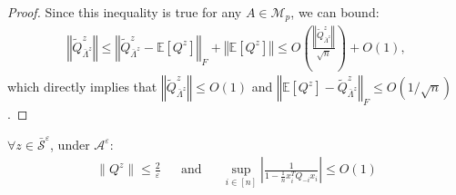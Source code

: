\documentclass{ws-rmta}
\begin{document}
\begin{proof}
  Since this inequality is true for any $A \in \mathcal M_p$, we can bound:
  \begin{align*}
    \left\Vert \tilde Q^z_{\bar \Lambda^z} \right\Vert \leq \left\Vert \tilde Q^z_{\bar \Lambda^z} - \mathbb E[Q^z] \right\Vert_F + \left\Vert \mathbb E[Q^z] \right\Vert \leq O \left( \frac{\left\Vert \tilde Q^z_{\bar \Lambda^z} \right\Vert}{\sqrt n} \right) + O(1),
  \end{align*}
  which directly implies that $\left\Vert \tilde Q^z_{\bar \Lambda^z} \right\Vert \leq O(1)$ and $\left\Vert \mathbb E[Q^z] -  \tilde Q^z_{\bar \Lambda^z} \right\Vert_F \leq O(1/\sqrt n)$.
\end{proof}
\begin{lemma}\label{lem:Q_borne}
  $\forall z \in \bar{\mathcal S}^\varepsilon$, under $\mathcal A^\varepsilon$: 
  \begin{align*}
    \|Q^z \| \leq \frac{2}{\varepsilon}&
    &\text{and}&
    &\sup_{i\in [n]}|\frac{1}{1 - \frac{1}{n} x_i^TQ_{-i}x_i} | \leq O(1)
  \end{align*}
\end{lemma}
\end{document}
